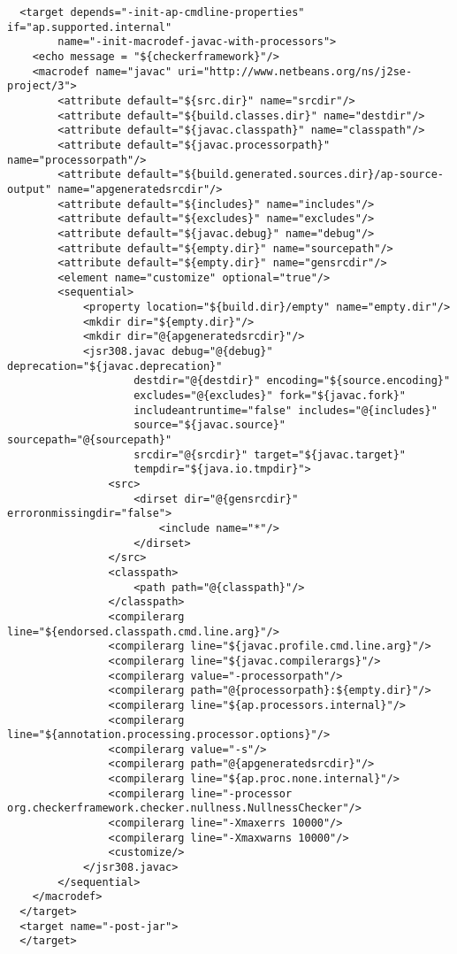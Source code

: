 \begin{enumerate}
\begin{smaller}
\begin{Verbatim}
  <target depends="-init-ap-cmdline-properties" if="ap.supported.internal"
        name="-init-macrodef-javac-with-processors">
    <echo message = "${checkerframework}"/>
    <macrodef name="javac" uri="http://www.netbeans.org/ns/j2se-project/3">
        <attribute default="${src.dir}" name="srcdir"/>
        <attribute default="${build.classes.dir}" name="destdir"/>
        <attribute default="${javac.classpath}" name="classpath"/>
        <attribute default="${javac.processorpath}" name="processorpath"/>
        <attribute default="${build.generated.sources.dir}/ap-source-output" name="apgeneratedsrcdir"/>
        <attribute default="${includes}" name="includes"/>
        <attribute default="${excludes}" name="excludes"/>
        <attribute default="${javac.debug}" name="debug"/>
        <attribute default="${empty.dir}" name="sourcepath"/>
        <attribute default="${empty.dir}" name="gensrcdir"/>
        <element name="customize" optional="true"/>
        <sequential>
            <property location="${build.dir}/empty" name="empty.dir"/>
            <mkdir dir="${empty.dir}"/>
            <mkdir dir="@{apgeneratedsrcdir}"/>
            <jsr308.javac debug="@{debug}" deprecation="${javac.deprecation}"
                    destdir="@{destdir}" encoding="${source.encoding}"
                    excludes="@{excludes}" fork="${javac.fork}"
                    includeantruntime="false" includes="@{includes}"
                    source="${javac.source}" sourcepath="@{sourcepath}"
                    srcdir="@{srcdir}" target="${javac.target}"
                    tempdir="${java.io.tmpdir}">
                <src>
                    <dirset dir="@{gensrcdir}" erroronmissingdir="false">
                        <include name="*"/>
                    </dirset>
                </src>
                <classpath>
                    <path path="@{classpath}"/>
                </classpath>
                <compilerarg line="${endorsed.classpath.cmd.line.arg}"/>
                <compilerarg line="${javac.profile.cmd.line.arg}"/>
                <compilerarg line="${javac.compilerargs}"/>
                <compilerarg value="-processorpath"/>
                <compilerarg path="@{processorpath}:${empty.dir}"/>
                <compilerarg line="${ap.processors.internal}"/>
                <compilerarg line="${annotation.processing.processor.options}"/>
                <compilerarg value="-s"/>
                <compilerarg path="@{apgeneratedsrcdir}"/>
                <compilerarg line="${ap.proc.none.internal}"/>
                <compilerarg line="-processor org.checkerframework.checker.nullness.NullnessChecker"/>
                <compilerarg line="-Xmaxerrs 10000"/>
                <compilerarg line="-Xmaxwarns 10000"/>
                <customize/>
            </jsr308.javac>
        </sequential>
    </macrodef>
  </target>
  <target name="-post-jar">
  </target>
\end{Verbatim}
\end{smaller}


\end{enumerate}
